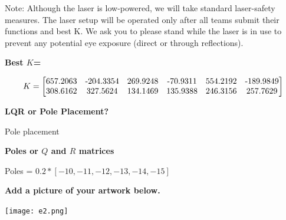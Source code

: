 \documentclass[11pt]{article}
\begin{document}
Note: Although the laser is low-powered, we will take standard laser-safety measures. The laser setup will be operated only after all teams submit their functions and best K. We ask you to please stand while the laser is in use to prevent any potential eye exposure (direct or through reflections).

\newpage

 \textbf{Best \( K \)=}
 
 \vspace{0.5cm}
 
  \[K=\begin{bmatrix}
    $657.2063$ & $-204.3354$ & $269.9248$ & $-70.9311$ & $554.2192$ & $-189.9849$\\
  	$308.6162$ & $327.5624$ & $134.1469$ & $135.9388$ & $246.3156$ & $257.7629$\end{bmatrix}\]

\textbf{LQR or Pole Placement?}\\


 \vspace{0.5cm}

Pole placement


 \vspace{0.5cm}

\textbf{Poles or \( Q \) and \( R \) matrices\\}


 \vspace{0.5cm}

Poles = $0.2*[-10, -11, -12, -13, -14, -15]$


 \vspace{0.5cm}

\textbf{Add a picture of your artwork below.}\\


 \vspace{0.5cm}

\centering
  \texttt{[image: e2.png]}

  
\end{document}
